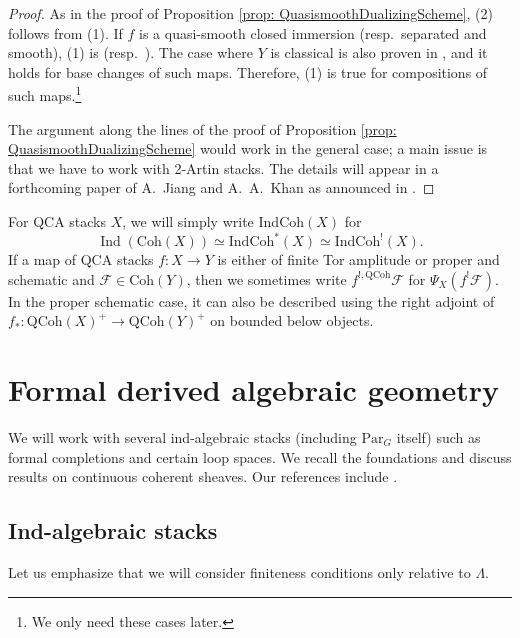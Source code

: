 \documentclass{amsart}
\theoremstyle{definition}
\theoremstyle{remark}
\numberwithin{equation}{section}
\DeclareMathOperator{\Ind}{Ind}
\newcommand{\mc}{\mathcal}
\newcommand{\Par}{\mathrm{Par}}
\newcommand{\IndCoh}{\mathrm{IndCoh}}
\newcommand{\QCoh}{\mathrm{QCoh}}
\newcommand{\Coh}{\mathrm{Coh}}
\begin{document}
\begin{proof}
As in the proof of Proposition \ref{prop: QuasismoothDualizingScheme}, (2) follows from (1). If $f$ is a quasi-smooth closed immersion (resp.~separated and smooth), (1) is \cite[Corollary 9.7.3.2]{GRII} (resp.~\cite[Proposition 9.7.3.4]{GRII}). The case where $Y$ is classical is also proven in \cite[Proposition 3.1.5]{HalpernLeistner}, and it holds for base changes of such maps. Therefore, (1) is true for compositions of such maps.\footnote{We only need these cases later.} 

The argument along the lines of the proof of Proposition \ref{prop: QuasismoothDualizingScheme} would work in the general case; a main issue is that we have to work with 2-Artin stacks. The details will appear in a forthcoming paper of A.~Jiang and A.~A.~Khan as announced in \cite[\S 0.4.3]{HekkingKhanRydh}.
\end{proof}

For QCA stacks $X$, we will simply write $\IndCoh(X)$ for
\[
\Ind(\Coh(X)) \simeq \IndCoh^*(X)\simeq \IndCoh^! (X). 
\]
If a map of QCA stacks $f\colon X\to Y$ is either of finite Tor amplitude or proper and schematic and $\mc F\in \Coh(Y)$, then we sometimes write $f^{!,\QCoh}\mc F$ for $\Psi_X (f^! \mc F)$. In the proper schematic case, it can also be described using the right adjoint of $f_*\colon \QCoh(X)^+ \to \QCoh(Y)^+$ on bounded below objects. 

\section{Formal derived algebraic geometry}
We will work with several ind-algebraic stacks (including $\Par_G$ itself) such as formal completions and certain loop spaces. We recall the foundations and discuss results on continuous coherent sheaves. Our references include \cite{chendhillon, DottoEmertonGee, ElmantoKubrakSosnilo, GRInd, HalpernLeistnerPreygel, ZhuTame}.  

\subsection{Ind-algebraic stacks}

Let us emphasize that we will consider finiteness conditions only relative to $\Lambda$. 
\end{document}
